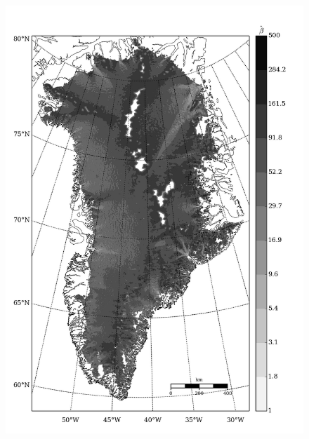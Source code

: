 \begin{figure}
  \centering
  \begin{minipage}[b]{0.47\linewidth}
    \includegraphics[width=1.0\textwidth]{images/greenland/stats/GLM_beta_no_T.jpg}
  \end{minipage}
  \quad
  \begin{minipage}[b]{0.47\linewidth}

\end{minipage}
\end{figure}
